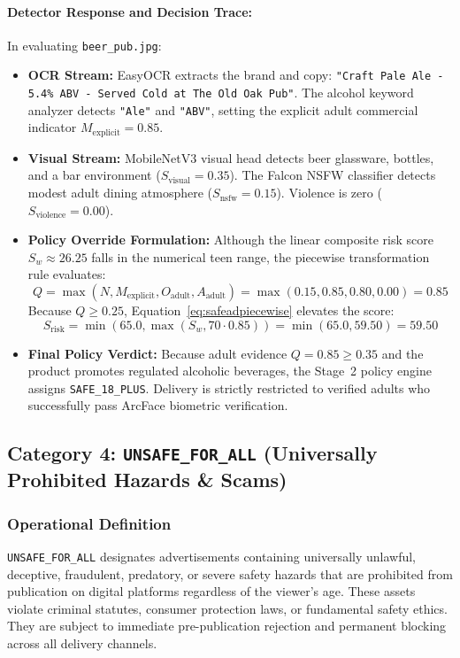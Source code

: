 \documentclass[12pt,a4paper]{report}
\begin{document}
\paragraph{Detector Response and Decision Trace:}
In evaluating \texttt{beer\_pub.jpg}:
\begin{itemize}
    \item \textbf{OCR Stream:} EasyOCR extracts the brand and copy: \texttt{"Craft Pale Ale - 5.4\% ABV - Served Cold at The Old Oak Pub"}. The alcohol keyword analyzer detects \texttt{"Ale"} and \texttt{"ABV"}, setting the explicit adult commercial indicator $M_{\text{explicit}} = 0.85$.
    \item \textbf{Visual Stream:} MobileNetV3 visual head detects beer glassware, bottles, and a bar environment ($S_{\text{visual}} = 0.35$). The Falcon NSFW classifier detects modest adult dining atmosphere ($S_{\text{nsfw}} = 0.15$). Violence is zero ($S_{\text{violence}} = 0.00$).
    \item \textbf{Policy Override Formulation:}
    Although the linear composite risk score $S_w \approx 26.25$ falls in the numerical teen range, the piecewise transformation rule evaluates:
    \begin{equation}
    Q = \max(N, M_{\text{explicit}}, O_{\text{adult}}, A_{\text{adult}}) = \max(0.15, 0.85, 0.80, 0.00) = 0.85
    \end{equation}
    Because $Q \ge 0.25$, Equation~\ref{eq:safeadpiecewise} elevates the score:
    \begin{equation}
    S_{\text{risk}} = \min(65.0, \max(S_w, 70 \cdot 0.85)) = \min(65.0, 59.50) = 59.50
    \end{equation}
    \item \textbf{Final Policy Verdict:} Because adult evidence $Q = 0.85 \ge 0.35$ and the product promotes regulated alcoholic beverages, the Stage~2 policy engine assigns \texttt{SAFE\_18\_PLUS}. Delivery is strictly restricted to verified adults who successfully pass ArcFace biometric verification.
\end{itemize}

\subsection{Category 4: \texttt{UNSAFE\_FOR\_ALL} (Universally Prohibited Hazards \& Scams)}

\subsubsection{Operational Definition}
\texttt{UNSAFE\_FOR\_ALL} designates advertisements containing universally unlawful, deceptive, fraudulent, predatory, or severe safety hazards that are prohibited from publication on digital platforms regardless of the viewer's age. These assets violate criminal statutes, consumer protection laws, or fundamental safety ethics. They are subject to immediate pre-publication rejection and permanent blocking across all delivery channels.
\end{document}
